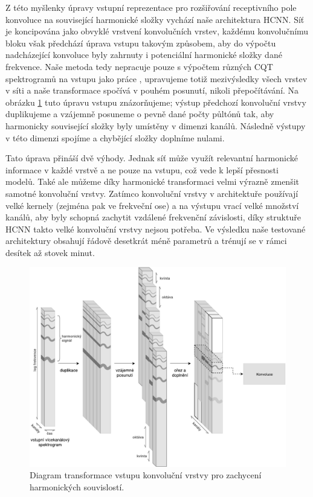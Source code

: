 Z této myšlenky úpravy vstupní reprezentace pro rozšiřování receptivního pole konvoluce na související harmonické složky vychází naše architektura HCNN. Síť je koncipována jako obvyklé vrstvení konvolučních vrstev, každému konvolučnímu bloku však předchází úprava vstupu takovým způsobem, aby do výpočtu nadcházející konvoluce byly zahrnuty i potenciální harmonické složky dané frekvence. Naše metoda tedy nepracuje pouze s výpočtem různých CQT spektrogramů na vstupu jako práce \cite{Bittner2017}, upravujeme totiž mezivýsledky všech vrstev v síti a naše transformace spočívá v pouhém posunutí, nikoli přepočítávání. Na obrázku \ref{obr:hcnn_harmonic_stacking} tuto úpravu vstupu znázorňujeme; výstup předchozí konvoluční vrstvy duplikujeme a vzájemně posuneme o pevně dané počty půltónů tak, aby harmonicky související složky byly umístěny  v dimenzi kanálů. Následně výstupy v této dimenzi spojíme a chybějící složky doplníme nulami.

Tato úprava přináší dvě výhody. Jednak síť může využít relevantní harmonické informace v každé vrstvě a ne pouze na vstupu, což vede k lepší přesnosti modelů. Také ale můžeme díky harmonické transformaci velmi výrazně zmenšit samotné konvoluční vrstvy. Zatímco konvoluční vrstvy v architektuře \cite{Bittner2017} používají velké kernely (zejména pak ve frekveční ose) a na výstupu vrací velké množství kanálů, aby byly schopná zachytit vzdálené frekvenční závislosti, díky struktuře HCNN takto velké konvoluční vrstvy nejsou potřeba. Ve výsledku naše testované architektury obsahují řádově desetkrát méně parametrů a trénují se v rámci desítek až stovek minut.

\begin{figure}[h]\centering
    \includegraphics[width=\textwidth,height=\textheight,keepaspectratio]{../img/hcnn_harmonic_stacking_2_grey}
\caption{Diagram transformace vstupu konvoluční vrstvy pro zachycení harmonických souvislostí.}\label{obr:hcnn_harmonic_stacking}
\end{figure}

